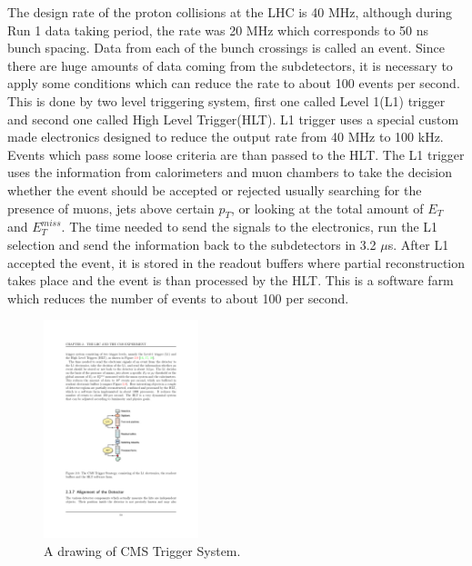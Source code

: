 The design rate of the proton collisions at the LHC is 40 MHz, although during Run 1 data taking period, the rate was 20 MHz which corresponds to 50 ns bunch spacing. Data from each of the bunch crossings is called an event. Since there are huge amounts of data coming from the subdetectors, it is necessary to apply some conditions which can reduce the rate to about 100 events per second. This is done by two level triggering system, first one called Level 1(L1) trigger and second one called High Level Trigger(HLT). L1 trigger uses a special custom made electronics designed to reduce the output rate from 40 MHz to 100 kHz. Events which pass some loose criteria are than passed to the HLT. The L1 trigger uses the information from calorimeters and muon chambers to take the decision whether the event should be accepted or rejected usually searching for the presence of muons, jets above certain $p_T$, or looking at the total amount of $E_T$ and $E_T^{miss}$. The time needed to send the signals to the electronics, run the L1 selection and send the information back to the subdetectors in 3.2 $\mu$s. After L1 accepted the event, it is stored in the readout buffers where partial reconstruction takes place and the event is than processed by the HLT. This is a software farm which reduces the number of events to about 100 per second. 
\begin{figure}[htbp]
	\centering
		\includegraphics[width=0.4\textwidth]{Figures/trigger.pdf}
	\caption[A drawing of CMS Trigger System.]{A drawing of CMS Trigger System. \cite{Chatrchyan:2008aa}}
	\label{fig:trig}
\end{figure}


